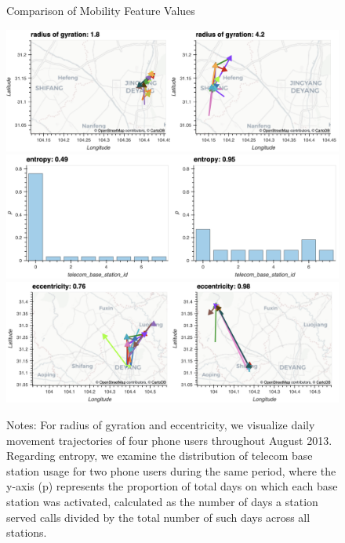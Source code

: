 \vspace{0.3cm}
\begin{figure}[h!]
\centering
\caption{Comparison of Mobility Feature Values}
\vspace{0.1cm}

\includegraphics[width=1\textwidth]{figures/rg_compare.png}
\includegraphics[width=1\textwidth]{figures/entropy_compare.png}
\includegraphics[width=1\textwidth]{figures/ecc_compare.png}

\vspace{0.1cm}
\caption*{Notes:  For radius of gyration and eccentricity, we visualize daily movement trajectories of four phone users throughout August 2013. Regarding entropy, we examine the distribution of telecom base station usage for two phone users during the same period, where the y-axis (p) represents the proportion of total days on which each base station was activated, calculated as the number of days a station served calls divided by the total number of such days across all stations.}
\label{fig:mobility}
\end{figure}

